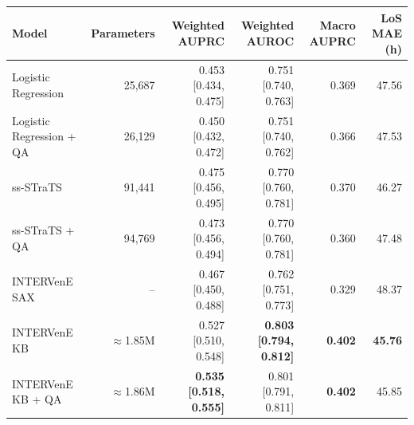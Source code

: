 \begin{tabular}{lrrrrr}
\toprule
Model & Parameters & Weighted AUPRC & Weighted AUROC & Macro AUPRC & LoS MAE (h) \\
\midrule
Logistic Regression & 25,687 & 0.453 [0.434, 0.475] & 0.751 [0.740, 0.763] & 0.369 & 47.56 \\
Logistic Regression + QA & 26,129 & 0.450 [0.432, 0.472] & 0.751 [0.740, 0.762] & 0.366 & 47.53 \\
\midrule
ss-STraTS & 91,441 & 0.475 [0.456, 0.495] & 0.770 [0.760, 0.781] & 0.370 & 46.27 \\
ss-STraTS + QA & 94,769 & 0.473 [0.456, 0.494] & 0.770 [0.760, 0.781] & 0.360 & 47.48 \\
\midrule
INTERVenE SAX & -- & 0.467 [0.450, 0.488] & 0.762 [0.751, 0.773] & 0.329 & 48.37 \\
INTERVenE KB & $\approx$1.85M & 0.527 [0.510, 0.548] & \textbf{0.803 [0.794, 0.812]} & \textbf{0.402} & \textbf{45.76} \\
INTERVenE KB + QA & $\approx$1.86M & \textbf{0.535 [0.518, 0.555]} & 0.801 [0.791, 0.811] & \textbf{0.402} & 45.85 \\
\bottomrule
\end{tabular}
